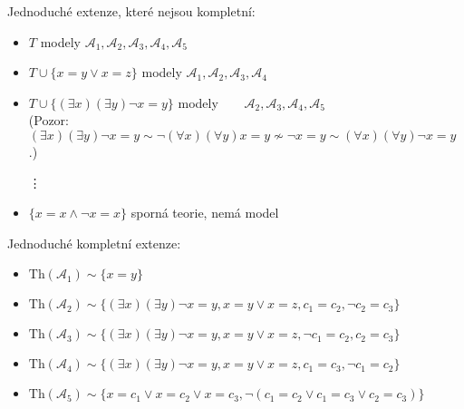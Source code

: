\begin{problem}
\begin{solution}
\begin{enumerate}[(a)]
            Jednoduché extenze, které nejsou kompletní:
            \begin{itemize}
                \item $T$ \hfill modely $\mathcal A_1,\mathcal A_2,\mathcal A_3,\mathcal A_4,\mathcal A_5$
                \item $T\cup\{x=y\lor x=z\}$ \hfill modely $\mathcal A_1,\mathcal A_2,\mathcal A_3,\mathcal A_4\phantom{,\mathcal A_5}$
                \item $T\cup\{(\exists x)(\exists y)\neg x=y\}$ \hfill modely $\phantom{\mathcal A_1,}\mathcal A_2,\mathcal A_3,\mathcal A_4,\mathcal A_5$\\
                (Pozor: $(\exists x)(\exists y)\neg x=y\sim\neg(\forall x)(\forall y)x=y\not\sim\neg x=y\sim(\forall x)(\forall y)\neg x=y$.)
                
                \item[\vdots]
                
                \item $\{x=x\land\neg x=x\}$ \hfill sporná teorie, nemá model
            \end{itemize}

            Jednoduché kompletní extenze:
            \begin{itemize}
                \item $\mathrm{Th}(\mathcal A_1)\sim\{x=y\}$
                \item $\mathrm{Th}(\mathcal A_2)\sim\{(\exists x)(\exists y)\neg x=y,x=y\lor x=z,c_1=c_2,\neg c_2=c_3\}$
                \item $\mathrm{Th}(\mathcal A_3)\sim\{(\exists x)(\exists y)\neg x=y,x=y\lor x=z,\neg c_1=c_2,c_2=c_3\}$
                \item $\mathrm{Th}(\mathcal A_4)\sim\{(\exists x)(\exists y)\neg x=y,x=y\lor x=z,c_1=c_3,\neg c_1=c_2\}$
                \item $\mathrm{Th}(\mathcal A_5)\sim\{x=c_1 \vee x=c_2 \vee x=c_3,\neg (c_1=c_2\lor c_1=c_3\lor c_2=c_3)\}$
            \end{itemize}    
            

\end{enumerate}
\end{solution}
\end{problem}
